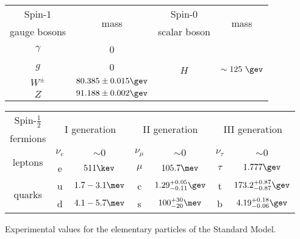 
    \begin{tabular}{cccc}\toprule
      Spin-$1$ & \multirow{2}{*}{mass} & Spin-0 & \multirow{2}{*}{mass}\\
      gauge bosons & & scalar boson & \\\midrule
    $\gamma$      & 0  & \multirow{4}{*}{$H$} & \multirow{4}{*}{$\sim 125~\gev$}                        \\
    $g$           & 0  & &                        \\
    $W^{\pm}$ & $ 80.385 \pm 0.015 \gev$ & &\\
    $Z$       & $ 91.188 \pm 0.002 \gev$ & &\\\bottomrule
    \end{tabular}

    \begin{tabular}{ccccccc}\toprule
      Spin-$\tfrac{1}{2}$ &  \multicolumn{2}{c}{\multirow{2}{*}{I generation}}
      &  \multicolumn{2}{c}{\multirow{2}{*}{II generation}}
      &  \multicolumn{2}{c}{\multirow{2}{*}{III generation}}\\
      fermions & & & & & \\\midrule
    \multirow{2}{*}{leptons} &
    $\nu_{e}$   & \small{$\sim 0$} &  
    $\nu_{\mu}$ & \small{$\sim 0$} &  
    $\nu_{\tau}$ & \small{$\sim 0$} \\
    &
    e            & \small{$511\kev$}   &  
    $\mu$ & \small{$105.7\mev$} &  
    $\tau$     & \small{$1.777\gev$} \\
    \multirow{2}{*}{quarks} &
    u & \small{$1.7-3.1\mev$}         &  
    c & \small{$1.29^{+0.05}_{-0.11}\gev$}  &  
    t & \small{$173.2^{+0.87}_{-0.87}\gev$}\\ %
    &
    d & \small{$4.1-5.7\mev$} &  
    s & \small{$100^{+30}_{-20}\mev$} &  
    b & \small{$4.19^{+0.18}_{-0.06}\gev$} \\\bottomrule
    \end{tabular}
  \caption{Experimental values for the elementary particles of the Standard Model.\label{tab:mass}}
